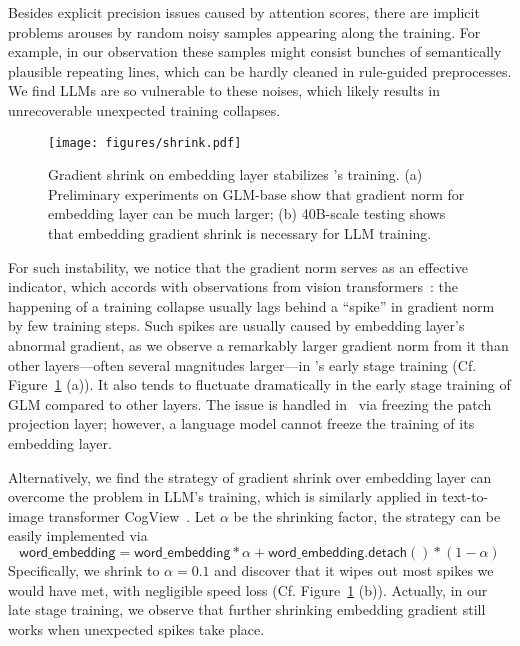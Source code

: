 {
Besides explicit precision issues caused by attention scores, there are implicit problems arouses by random noisy samples appearing along the training.
For example, in our observation these samples might consist bunches of semantically plausible repeating lines, which can be hardly cleaned in rule-guided preprocesses.
We find LLMs are so vulnerable to these noises, which likely results in unrecoverable unexpected training collapses.

\begin{figure}[t]
    \centering
    \texttt{[image: figures/shrink.pdf]}
    \vspace{-6mm}
    \caption{Gradient shrink on embedding layer stabilizes \glm's training. (a) Preliminary experiments on GLM-base show that gradient norm for embedding layer can be much larger; (b) 40B-scale testing shows that embedding gradient shrink is necessary for LLM training.}
    \label{fig:shrink}
    \vspace{-6mm}
\end{figure}

For such instability, we notice that the gradient norm serves as an effective indicator, which accords with observations from vision transformers~\citep{chen2021empirical,ding2021cogview}: the happening of a training collapse usually lags behind a ``spike'' in gradient norm by few training steps. %
Such spikes are usually caused by embedding layer's abnormal gradient, as we observe a remarkably larger gradient norm from it than other layers---often several magnitudes larger---in \glm's early stage training (Cf. Figure~\ref{fig:shrink} (a)).
It also tends to fluctuate dramatically in the early stage training of GLM compared to other layers.
The issue is handled in~\citep{chen2021empirical} via freezing the patch projection layer; however, a language model cannot freeze the training of its embedding layer.

Alternatively, we find the strategy of gradient shrink over embedding layer can overcome the problem in LLM's training, which is similarly applied in text-to-image transformer CogView~\citep{ding2021cogview}.
Let $\alpha$ be the shrinking factor, the strategy can be easily implemented via
\begin{equation}
    \mathsf{word\_embedding} = \mathsf{word\_embedding} * \alpha + \mathsf{word\_embedding.detach()} * (1 - \alpha)
\end{equation}
Specifically, we shrink to $\alpha=0.1$ and discover that it wipes out most spikes we would have met, with negligible speed loss (Cf. Figure~\ref{fig:shrink} (b)).
Actually, in our late stage training, we observe that further shrinking embedding gradient still works when unexpected spikes take place.

}
